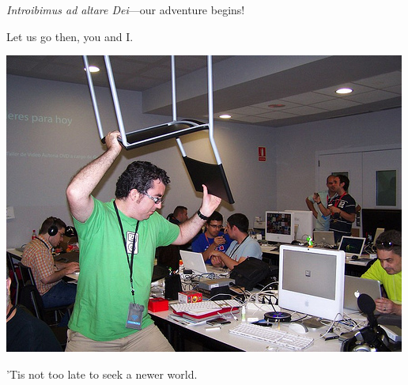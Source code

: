 \documentclass{beamer}
\begin{document}
\begin{frame}{\textit{Introibimus ad altare Dei}---our adventure begins!}
\begin{center}
Let us go then, you and I.

\vspace{.25in}
\includegraphics[scale=0.33]{images/angry.jpg}
\vspace{.25in}

'Tis not too late to seek a newer world.
\end{center}
\end{frame}
\end{document}
